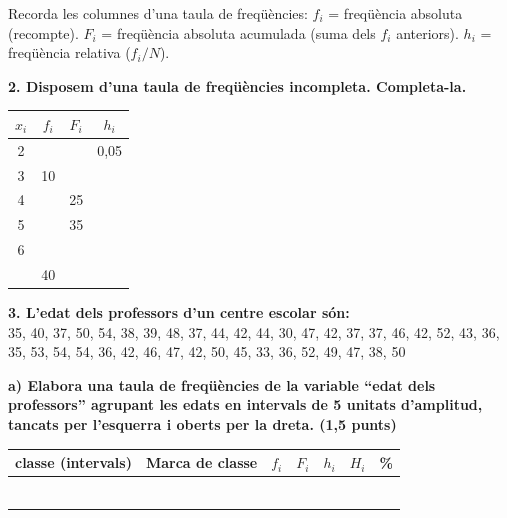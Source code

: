 \documentclass[12pt,a4paper]{article}
\begin{document}
\begin{capsula}
Recorda les columnes d'una taula de freqüències: 
$f_i$ = freqüència absoluta (recompte). 
$F_i$ = freqüència absoluta acumulada (suma dels $f_i$ anteriors).
$h_i$ = freqüència relativa ($f_i / N$).
\end{capsula}

\textbf{2. Disposem d’una taula de freqüències incompleta. Completa-la.}
\begin{center}
\renewcommand{\arraystretch}{2}
\begin{tabular}{|c|c|c|c|}
\hline
\rowcolor{cyan!15}
\textbf{$x_i$} & \textbf{$f_i$} & \textbf{$F_i$} & \textbf{$h_i$} \\ \hline
2 & & & 0,05 \\ \hline
3 & 10 & & \\ \hline
4 & & 25 & \\ \hline
5 & & 35 & \\ \hline
6 & & & \\ \hline
 & 40 & & \\ \hline
\end{tabular}
\end{center}

\vspace{0.5cm}

\textbf{3. L’edat dels professors d’un centre escolar són:} \\
35, 40, 37, 50, 54, 38, 39, 48, 37, 44, 42, 44, 30, 47, 42, 37, 37, 46, 42, 52, 43, 36, 35, 53, 54, 54, 36, 42, 46, 47, 42, 50, 45, 33, 36, 52, 49, 47, 38, 50

\textbf{a) Elabora una taula de freqüències de la variable “edat dels professors” agrupant les edats en intervals de 5 unitats d’amplitud, tancats per l’esquerra i oberts per la dreta. (1,5 punts)}

\begin{center}
\renewcommand{\arraystretch}{2}
\begin{tabular}{|c|c|c|c|c|c|c|}
\hline
classe (intervals) & Marca de classe & $f_i$ & $F_i$ & $h_i$ & $H_i$ & \% \\ \hline
 & & & & & & \\ \hline
 & & & & & & \\ \hline
 & & & & & & \\ \hline
 & & & & & & \\ \hline
 & & & & & & \\ \hline
 & & & & & & \\ \hline
\end{tabular}
\end{center}
\end{document}
